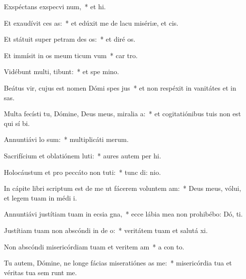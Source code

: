 \item Exspéctans exspecvi num,~* et  hi.
\item Et exaudívit ces as:~* et edúxit me de lacu misériæ, et   cis.
\item Et státuit super petram des os:~* et diré  os.
\item Et immísit in os meum ticum vum~* car  tro.
\item Vidébunt multi,  tibunt:~* et spe  mino.
\item Beátus vir, cujus est nomen Dómi spes jus~* et non respéxit in vanitátes et in sas.
\item Multa fecísti tu, Dómine, Deus meus, miralia a:~* et cogitatiónibus tuis non est qui sí  bi.
\item Annuntiávi  lo sum:~* multiplicáti   merum.
\item Sacrifícium et oblatiónem luti:~* aures autem per hi.
\item Holocáustum et pro peccáto non tuti:~* tunc di:  nio.
\item In cápite libri scriptum est de me ut fácerem voluntem am:~* Deus meus, vólui, et legem tuam in médi  i.
\item Annuntiávi justítiam tuam in ecsia gna,~* ecce lábia mea non prohibébo: Dó,  ti.
\item Justítiam tuam non abscóndi in de o:~* veritátem tuam et salutá  xi.
\item Non abscóndi misericórdiam tuam et veritem am~* a con to.
\item Tu autem, Dómine, ne longe fácias miseratiónes as  me:~* misericórdia tua et véritas tua sem runt me.
